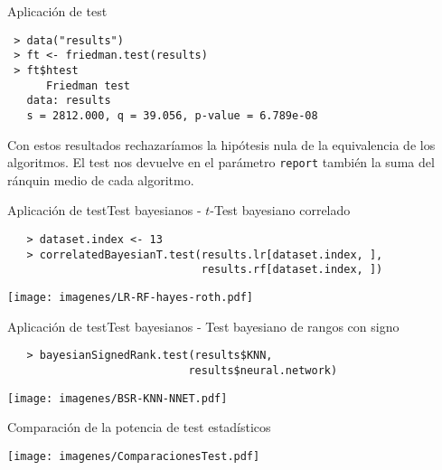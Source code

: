 \documentclass[leqno]{beamer}
\theoremstyle{definition_wo_parentheses}
\begin{document}
\begin{frame}[fragile]{Aplicación de test}
\begin{verbatim}
 > data("results")
 > ft <- friedman.test(results)
 > ft$htest
      Friedman test
   data: results
   s = 2812.000, q = 39.056, p-value = 6.789e-08
\end{verbatim}
Con estos resultados rechazaríamos la hipótesis nula de la 
equivalencia de los algoritmos. El test nos devuelve en el 
parámetro \texttt{report} también la suma del ránquin
medio de cada algoritmo. 
\end{frame}


\begin{frame}[fragile]{Aplicación de test}{Test bayesianos - $t$-Test bayesiano correlado}
   \begin{verbatim}
   > dataset.index <- 13
   > correlatedBayesianT.test(results.lr[dataset.index, ],
                              results.rf[dataset.index, ])
   \end{verbatim}
   \begin{center}
   \texttt{[image: imagenes/LR-RF-hayes-roth.pdf]}
   \end{center}
\end{frame}


\begin{frame}[fragile]{Aplicación de test}{Test bayesianos - Test bayesiano de rangos con signo}
   \begin{verbatim}
   > bayesianSignedRank.test(results$KNN,
                            results$neural.network)
   \end{verbatim}
   \begin{center}
   \texttt{[image: imagenes/BSR-KNN-NNET.pdf]}
   \end{center}
\end{frame}



\begin{frame}[fragile]{Comparación de la potencia de test estadísticos}
   \begin{center}
   \texttt{[image: imagenes/ComparacionesTest.pdf]}
   \end{center}
\end{frame}

\end{document}
